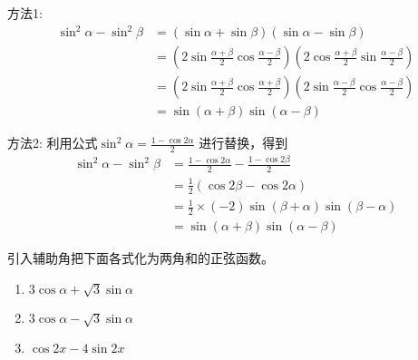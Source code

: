 \begin{solution}
方法1:
\[\begin{split}
    \sin^2\alpha-\sin^2\beta&=(\sin\alpha+\sin\beta)(\sin\alpha-\sin\beta)\\
    &=\left(2\sin\frac{\alpha+\beta}{2}\cos\frac{\alpha-\beta}{2}\right)\left(2\cos\frac{\alpha+\beta}{2}\sin\frac{\alpha-\beta}{2}\right)\\
    &=\left(2\sin\frac{\alpha+\beta}{2}\cos\frac{\alpha+\beta}{2}\right)\left(2\sin\frac{\alpha-\beta}{2}\cos\frac{\alpha-\beta}{2}\right)\\
    &=\sin(\alpha+\beta)\sin(\alpha-\beta)
\end{split}\]

方法2: 利用公式$\sin^2\alpha=\frac{1-\cos2\alpha}{2}$
进行替换，得到
\[\begin{split}
    \sin^2\alpha-\sin^2\beta&=\frac{1-\cos2\alpha}{2}-\frac{1-\cos2\beta}{2}\\
    &=\frac{1}{2}(\cos2\beta-\cos2\alpha)\\
    &=\frac{1}{2}\times (-2)\sin(\beta+\alpha)\sin(\beta-\alpha)\\
    &=\sin(\alpha+\beta)\sin(\alpha-\beta)
\end{split}\]
\end{solution}


\begin{example}
    引入辅助角把下面各式化为两角和的正弦函数。
\begin{enumerate}
    \item $3\cos\alpha+\sqrt{3}\sin\alpha$
    \item $3\cos\alpha-\sqrt{3}\sin\alpha$
    \item $\cos 2x-4\sin 2x$
\end{enumerate}
\end{example}

